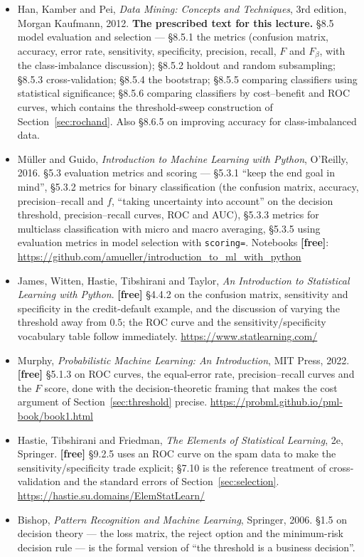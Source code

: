 \documentclass[11pt]{article}
\begin{document}
\begin{itemize}[leftmargin=*]
  \item Han, Kamber and Pei, \emph{Data Mining: Concepts and Techniques}, 3rd
    edition, Morgan Kaufmann, 2012. \textbf{The prescribed text for this
    lecture.} \S8.5 model evaluation and selection --- \S8.5.1 the metrics
    (confusion matrix, accuracy, error rate, sensitivity, specificity,
    precision, recall, $F$ and $F_\beta$, with the class-imbalance discussion);
    \S8.5.2 holdout and random subsampling; \S8.5.3 cross-validation;
    \S8.5.4 the bootstrap; \S8.5.5 comparing classifiers using statistical
    significance; \S8.5.6 comparing classifiers by cost--benefit and ROC curves,
    which contains the threshold-sweep construction of
    Section~\ref{sec:rochand}. Also \S8.6.5 on improving accuracy for
    class-imbalanced data.
  \item M\"uller and Guido, \emph{Introduction to Machine Learning with
    Python}, O'Reilly, 2016. \S5.3 evaluation metrics and scoring ---
    \S5.3.1 ``keep the end goal in mind'', \S5.3.2 metrics for binary
    classification (the confusion matrix, accuracy, precision--recall and $f$,
    ``taking uncertainty into account'' on the decision threshold,
    precision--recall curves, ROC and AUC), \S5.3.3 metrics for multiclass
    classification with micro and macro averaging, \S5.3.5 using evaluation
    metrics in model selection with \texttt{scoring=}. Notebooks
    \textbf{[free]}:
    \url{https://github.com/amueller/introduction_to_ml_with_python}
  \item James, Witten, Hastie, Tibshirani and Taylor, \emph{An Introduction to
    Statistical Learning with Python}. \textbf{[free]} \S4.4.2 on the confusion
    matrix, sensitivity and specificity in the credit-default example, and the
    discussion of varying the threshold away from $0.5$; the ROC curve and the
    sensitivity/specificity vocabulary table follow immediately.
    \url{https://www.statlearning.com/}
  \item Murphy, \emph{Probabilistic Machine Learning: An Introduction}, MIT
    Press, 2022. \textbf{[free]} \S5.1.3 on ROC curves, the equal-error rate,
    precision--recall curves and the $F$ score, done with the decision-theoretic
    framing that makes the cost argument of Section~\ref{sec:threshold} precise.
    \url{https://probml.github.io/pml-book/book1.html}
  \item Hastie, Tibshirani and Friedman, \emph{The Elements of Statistical
    Learning}, 2e, Springer. \textbf{[free]} \S9.2.5 uses an ROC curve on the
    spam data to make the sensitivity/specificity trade explicit; \S7.10 is the
    reference treatment of cross-validation and the standard errors of
    Section~\ref{sec:selection}.
    \url{https://hastie.su.domains/ElemStatLearn/}
  \item Bishop, \emph{Pattern Recognition and Machine Learning}, Springer, 2006.
    \S1.5 on decision theory --- the loss matrix, the reject option and the
    minimum-risk decision rule --- is the formal version of ``the threshold is a
    business decision''.
\end{itemize}
\end{document}
